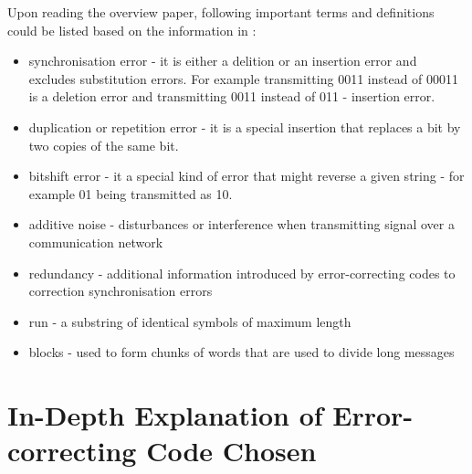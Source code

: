\documentclass[12pt]%
{article}
\begin{document}
Upon reading the overview paper, following important terms and definitions could be listed based on the information in \cite{mercier2010survey}:
\begin{itemize}
\item synchronisation error - it is either a delition or an insertion error and excludes substitution errors. For example transmitting 0011 instead of 00011 is a deletion error and transmitting 0011 instead of 011 - insertion error.
\item duplication or repetition error - it is a special insertion that replaces a bit by two copies of the same bit.
\item bitshift error - it a special kind of error that might reverse a given string - for example 01 being transmitted as 10.
\item additive noise - disturbances or interference when transmitting signal over a communication network
\item redundancy - additional information introduced by error-correcting codes to correction synchronisation errors
\item run - a substring of identical symbols of maximum length
\item blocks - used to form chunks of words that are used to divide long messages
\end{itemize}


\newpage

\section{In-Depth Explanation of Error-correcting Code Chosen}
\end{document}
